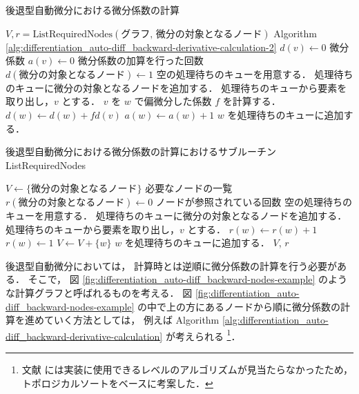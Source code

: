 \begin{algorithm}[tp]
    \caption{後退型自動微分における微分係数の計算}
    \label{alg:differentiation_auto-diff_backward-derivative-calculation}
    \begin{algorithmic}
        \State $V, r = \text{ListRequiredNodes}(\text{グラフ, 微分の対象となるノード})$
        \Comment Algorithm \ref{alg:differentiation_auto-diff_backward-derivative-calculation-2}
        \State $d(v) \gets 0$ \Comment 微分係数
        \State $a(v) \gets 0$ \Comment 微分係数の加算を行った回数
        \EndFor
        \State $d(\text{微分の対象となるノード}) \gets 1$
        \State 空の処理待ちのキューを用意する．
        \State 処理待ちのキューに微分の対象となるノードを追加する．
        \State 処理待ちのキューから要素を取り出し，$v$ とする．
        \State $v$ を $w$ で偏微分した係数 $f$ を計算する．
        \State $d(w) \gets d(w) + f d(v)$
        \State $a(w) \gets a(w) + 1$
        \State $w$ を処理待ちのキューに追加する．
        \EndIf
        \EndFor
        \EndWhile
        \EndProcedure
    \end{algorithmic}
\end{algorithm}
\begin{algorithm}[tp]
    \caption{後退型自動微分における微分係数の計算におけるサブルーチン ListRequiredNodes}
    \label{alg:differentiation_auto-diff_backward-derivative-calculation-2}
    \begin{algorithmic}
        \State $V \gets \{\text{微分の対象となるノード}\}$ \Comment 必要なノードの一覧
        \State $r(\text{微分の対象となるノード}) \gets 0$ \Comment ノードが参照されている回数
        \State 空の処理待ちのキューを用意する．
        \State 処理待ちのキューに微分の対象となるノードを追加する．
        \State 処理待ちのキューから要素を取り出し，$v$ とする．
        \State $r(w) \gets r(w) + 1$
        \Else
        \State $r(w) \gets 1$
        \EndIf
        \State $V \gets V + \{w\}$
        \State $w$ を処理待ちのキューに追加する．
        \EndIf
        \EndFor
        \EndWhile
        \State \Return $V$, $r$
        \EndProcedure
    \end{algorithmic}
\end{algorithm}

後退型自動微分においては，
計算時とは逆順に微分係数の計算を行う必要がある．
そこで，
図 \ref{fig:differentiation_auto-diff_backward-nodes-example}
のような計算グラフと呼ばれるものを考える\cite{Kubota1998}．
図 \ref{fig:differentiation_auto-diff_backward-nodes-example}
の中で上の方にあるノードから順に微分係数の計算を進めていく方法としては，
例えば
Algorithm \ref{alg:differentiation_auto-diff_backward-derivative-calculation}
が考えられる
\footnote{文献 \cite{Kubota1998} には実装に使用できるレベルのアルゴリズムが見当たらなかったため，%
    トポロジカルソートをベースに考案した．}．
